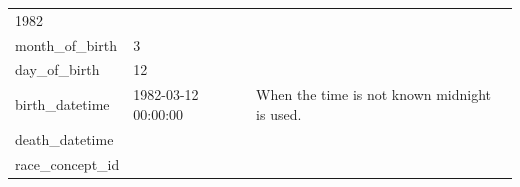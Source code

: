 \documentclass[11pt]{book}
\begin{document}
\begin{longtable}[]{@{}lll@{}}
\begin{minipage}[t]{0.16\columnwidth}
1982\strut
\end{minipage} & \begin{minipage}[t]{0.48\columnwidth}\raggedright\strut
\strut
\end{minipage}\tabularnewline
\begin{minipage}[t]{0.28\columnwidth}\raggedright\strut
month\_of\_birth\strut
\end{minipage} & \begin{minipage}[t]{0.16\columnwidth}\raggedright\strut
3\strut
\end{minipage} & \begin{minipage}[t]{0.48\columnwidth}\raggedright\strut
\strut
\end{minipage}\tabularnewline
\begin{minipage}[t]{0.28\columnwidth}\raggedright\strut
day\_of\_birth\strut
\end{minipage} & \begin{minipage}[t]{0.16\columnwidth}\raggedright\strut
12\strut
\end{minipage} & \begin{minipage}[t]{0.48\columnwidth}\raggedright\strut
\strut
\end{minipage}\tabularnewline
\begin{minipage}[t]{0.28\columnwidth}\raggedright\strut
birth\_datetime\strut
\end{minipage} & \begin{minipage}[t]{0.16\columnwidth}\raggedright\strut
1982-03-12 00:00:00\strut
\end{minipage} & \begin{minipage}[t]{0.48\columnwidth}\raggedright\strut
When the time is not known midnight is used.\strut
\end{minipage}\tabularnewline
\begin{minipage}[t]{0.28\columnwidth}\raggedright\strut
death\_datetime\strut
\end{minipage} & \begin{minipage}[t]{0.16\columnwidth}\raggedright\strut
\strut
\end{minipage} & \begin{minipage}[t]{0.48\columnwidth}\raggedright\strut
\strut
\end{minipage}\tabularnewline
\begin{minipage}[t]{0.28\columnwidth}\raggedright\strut
race\_concept\_id\strut
\end{minipage} & \begin{minipage}[t]{0.16\columnwidth}\raggedright\strut

\end{minipage}
\end{longtable}
\end{document}

